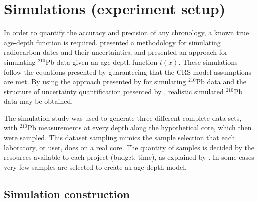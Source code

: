\documentclass [10pt] {article}
\begin{document}



\section{Simulations (experiment setup)}

	In order to quantify the accuracy and precision of any chronology, a known true age-depth function is required.
\citet{Blaauw2018} presented a methodology for simulating radiocarbon dates and their uncertainties, and \citet{Aquino2018} presented an approach for simulating $^{210}$Pb data given an age-depth function $t(x)$.
These simulations follow the equations presented by \cite{Appleby1978, Robbins1978} guaranteeing that the CRS model assumptions are met. 
By using the approach presented by \citet{Aquino2018} for simulating $^{210}$Pb data and the structure of uncertainty quantification presented by \citet{Blaauw2018}, realistic simulated $^{210}$Pb data may be obtained.

	The simulation study was used to generate three different complete data sets, with $^{210}$Pb measurements at every depth along the hypothetical core, which then were sampled. 
This dataset sampling mimics the sample selection that each laboratory, or user, does on a real core.
The quantity of samples is decided by the resources available to each project (budget, time), as explained by \citet{Blaauw2018}. 
In some cases very few samples are selected to create an age-depth model.

\subsection{Simulation construction}\label{sec:SimConst}
\end{document}
